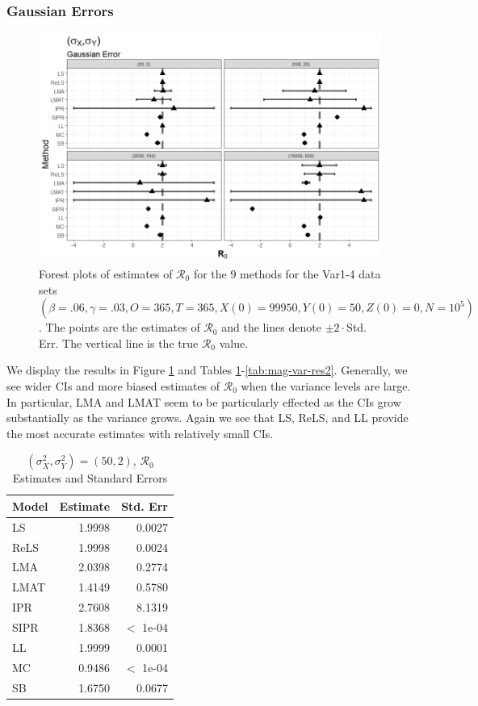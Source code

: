 \documentclass[12pt]{article}
\newcommand{\xxsir}{\ensuremath{9} } %
\newcommand{\rr}{\ensuremath{\mathcal{R}_0}}
\begin{document}
\subsubsection{Gaussian Errors}

\begin{figure}[H]
\begin{center}
  \includegraphics[scale=0.5]{images/var_n.jpeg}
  \caption{Forest plots of estimates of $\rr$ for the \xxsir methods for the Var1-4 data sets $(\beta=.06, \gamma=.03, O=365, T=365, X(0)=99950, Y(0)=50, Z(0)=0, N=10^5)$.  The points are the estimates of $\rr$ and the lines denote $\pm 2\cdot $Std. Err.  The vertical line is the true $\rr$ value.}
  \label{fig:mag-var-res}
\end{center}
\end{figure}

We display the results in Figure \ref{fig:mag-var-res} and Tables \ref{tab:mag-var-res1}-\ref{tab:mag-var-res2}.  Generally, we see wider CIs and more biased estimates of $\rr$ when the variance levels are large.  In particular, LMA and LMAT seem to be particularly effected as the CIs grow substantially as the variance grows.  Again we see that LS, ReLS, and LL provide the most accurate estimates with relatively small CIs.

\begin{table}[H]
	

	\centering
	\begin{tabular}[t]{l|r|r}
		\hline
		Model & Estimate & Std. Err\\
		\hline
		LS & 1.9998 & 0.0027\\
		\hline
		ReLS & 1.9998 & 0.0024\\
		\hline
		LMA & 2.0398 & 0.2774\\
		\hline
		LMAT & 1.4149 & 0.5780\\
		\hline
		IPR & 2.7608 & 8.1319\\
		\hline
		SIPR & 1.8368 & $<$ 1e-04\\
		\hline
		LL & 1.9999 & 0.0001\\
		\hline
		MC & 0.9486 & $<$ 1e-04\\
		\hline
		SB & 1.6750 & 0.0677\\
		\hline
	\end{tabular}
        	\caption{ $(\sigma^2_X, \sigma^2_Y) = (50, 2)$, $\rr$ Estimates and Standard Errors}\label{tab:mag-var-res1}
\end{table}
\end{document}

